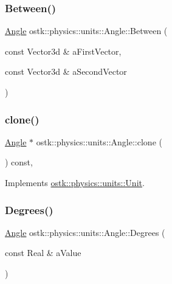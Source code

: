 \subsubsection{\texorpdfstring{Between()}{Between()}\hspace{0.1cm}{\footnotesize\ttfamily [2/2]}}
{\footnotesize\ttfamily \hyperlink{classostk_1_1physics_1_1units_1_1_angle}{Angle} ostk\+::physics\+::units\+::\+Angle\+::\+Between (\begin{DoxyParamCaption}\item[{const Vector3d \&}]{a\+First\+Vector,  }\item[{const Vector3d \&}]{a\+Second\+Vector }\end{DoxyParamCaption})\hspace{0.3cm}{\ttfamily [static]}}

\mbox{\label{classostk_1_1physics_1_1units_1_1_angle_af0d5d649b2a1310e6337663f7b9283bf}} 
\subsubsection{\texorpdfstring{clone()}{clone()}}
{\footnotesize\ttfamily \hyperlink{classostk_1_1physics_1_1units_1_1_angle}{Angle} $\ast$ ostk\+::physics\+::units\+::\+Angle\+::clone (\begin{DoxyParamCaption}{ }\end{DoxyParamCaption}) const\hspace{0.3cm}{\ttfamily [override]}, {\ttfamily [virtual]}}



Implements \hyperlink{classostk_1_1physics_1_1units_1_1_unit_ab203628f8a16b16c28d89eaa4c3aff67}{ostk\+::physics\+::units\+::\+Unit}.

\mbox{\label{classostk_1_1physics_1_1units_1_1_angle_a6cddbceb5fd1f0c2a6dd29dae047baee}} 
\subsubsection{\texorpdfstring{Degrees()}{Degrees()}}
{\footnotesize\ttfamily \hyperlink{classostk_1_1physics_1_1units_1_1_angle}{Angle} ostk\+::physics\+::units\+::\+Angle\+::\+Degrees (\begin{DoxyParamCaption}\item[{const Real \&}]{a\+Value }\end{DoxyParamCaption})\hspace{0.3cm}{\ttfamily [static]}}

